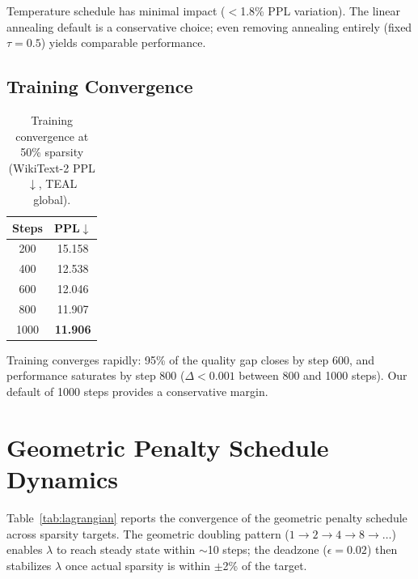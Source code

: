 Temperature schedule has minimal impact ($<$1.8\% PPL variation).
The linear annealing default is a conservative choice; even removing annealing entirely (fixed $\tau{=}0.5$) yields comparable performance.

\subsection{Training Convergence}
\label{app:training_convergence}

\begin{table}[h]
\centering
\caption{Training convergence at 50\% sparsity (WikiText-2 PPL$\downarrow$, TEAL global).}
\label{tab:training_convergence}
\small
\begin{tabular}{cc}
\toprule
Steps & PPL$\downarrow$ \\
\midrule
200 & 15.158 \\ %
400 & 12.538 \\ %
600 & 12.046 \\ %
800 & 11.907 \\ %
1000 & \textbf{11.906} \\ %
\bottomrule
\end{tabular}
\end{table}

Training converges rapidly: 95\% of the quality gap closes by step 600, and performance saturates by step 800 ($\Delta < 0.001$ between 800 and 1000 steps).
Our default of 1000 steps provides a conservative margin.


\section{Geometric Penalty Schedule Dynamics}
\label{app:lagrangian}

Table~\ref{tab:lagrangian} reports the convergence of the geometric penalty schedule across sparsity targets.
The geometric doubling pattern ($1 \to 2 \to 4 \to 8 \to \ldots$) enables $\lambda$ to reach steady state within $\sim$10 steps; the deadzone ($\epsilon = 0.02$) then stabilizes $\lambda$ once actual sparsity is within $\pm$2\% of the target.


